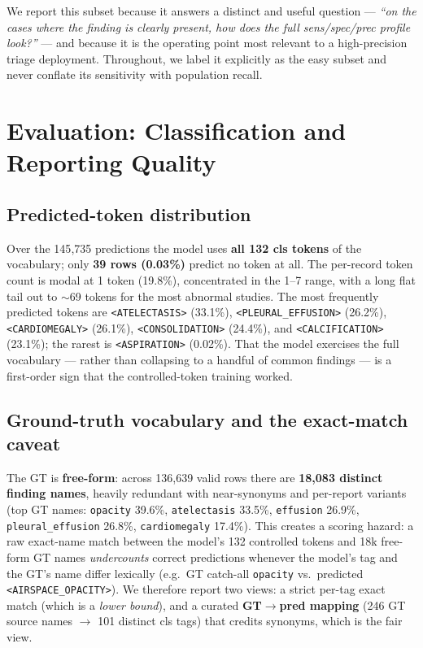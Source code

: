 \documentclass[11pt,a4paper]{article}
\begin{document}
We report this subset because it answers a distinct and useful question --- \emph{``on the cases where the finding is clearly present, how does the full sens/spec/prec profile look?''} --- and because it is the operating point most relevant to a high-precision triage deployment. Throughout, we label it explicitly as the easy subset and never conflate its sensitivity with population recall.

\section{Evaluation: Classification and Reporting Quality}
\label{sec:eval-results}

\subsection{Predicted-token distribution}
Over the 145{,}735 predictions the model uses \textbf{all 132 cls tokens} of the vocabulary; only \textbf{39 rows (0.03\%)} predict no token at all. The per-record token count is modal at 1 token (19.8\%), concentrated in the 1--7 range, with a long flat tail out to $\sim$69 tokens for the most abnormal studies. The most frequently predicted tokens are \texttt{<ATELECTASIS>} (33.1\%), \texttt{<PLEURAL\_EFFUSION>} (26.2\%), \texttt{<CARDIOMEGALY>} (26.1\%), \texttt{<CONSOLIDATION>} (24.4\%), and \texttt{<CALCIFICATION>} (23.1\%); the rarest is \texttt{<ASPIRATION>} (0.02\%). That the model exercises the full vocabulary --- rather than collapsing to a handful of common findings --- is a first-order sign that the controlled-token training worked.

\subsection{Ground-truth vocabulary and the exact-match caveat}
The GT is \textbf{free-form}: across 136{,}639 valid rows there are \textbf{18{,}083 distinct finding names}, heavily redundant with near-synonyms and per-report variants (top GT names: \texttt{opacity} 39.6\%, \texttt{atelectasis} 33.5\%, \texttt{effusion} 26.9\%, \texttt{pleural\_effusion} 26.8\%, \texttt{cardiomegaly} 17.4\%). This creates a scoring hazard: a raw exact-name match between the model's 132 controlled tokens and 18k free-form GT names \emph{undercounts} correct predictions whenever the model's tag and the GT's name differ lexically (e.g.\ GT catch-all \texttt{opacity} vs.\ predicted \texttt{<AIRSPACE\_OPACITY>}). We therefore report two views: a strict per-tag exact match (which is a \emph{lower bound}), and a curated \textbf{GT$\rightarrow$pred mapping} (246 GT source names $\rightarrow$ 101 distinct cls tags) that credits synonyms, which is the fair view.
\end{document}
